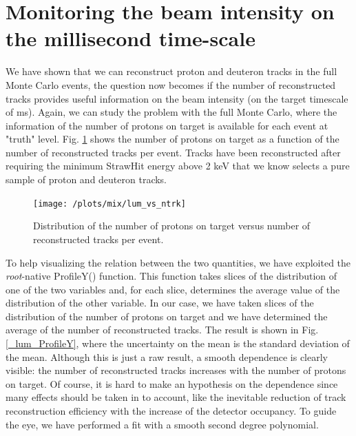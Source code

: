 \documentclass[12pt,a4paper,openright, oneside, titlepage]{book} %
\begin{document}
\section{Monitoring the beam intensity on the millisecond time-scale}
We have shown that we can reconstruct proton and deuteron tracks in the full Monte Carlo events, the question now becomes if the number of reconstructed tracks provides useful information on the beam intensity (on the target timescale of ms). 
Again, we can study the problem with the full Monte Carlo, where the information of the number of protons on target is available for each event at "truth" level.
Fig. \ref{_lum_vs_ntrk} shows the number of protons on target as a function of the number of reconstructed tracks per event. 
Tracks have been reconstructed after requiring the minimum StrawHit energy above 2 keV that we know selects a pure sample of proton and deuteron tracks.

\begin{figure}[!htb]
\centering
\texttt{[image: /plots/mix/lum\_vs\_ntrk]}
\caption[Protons on target and number of tracks]
{Distribution of the number of protons on target versus number of reconstructed tracks per event.}
\label{_lum_vs_ntrk}
\end{figure}

\noindent To help visualizing the relation between the two quantities, we have exploited the \textit{root}-native ProfileY() function. 
This function takes slices of the distribution of one of the two variables and, for each slice, determines the average value of the distribution of the other variable. 
In our case, we have taken slices of the distribution of the number of protons on target and we have determined the average of the number of reconstructed tracks. 
The result is shown in Fig. \ref{_lum_ProfileY}, where the uncertainty on the mean is the standard deviation of the mean.
Although this is just a raw result, a smooth dependence is clearly visible: the number of reconstructed tracks increases with the number of protons on target. 
Of course, it is hard to make an hypothesis on the dependence since many effects should be taken in to account, like the inevitable reduction of track reconstruction efficiency with the increase of the detector occupancy.
To guide the eye, we have performed a fit with a smooth second degree polynomial.\\
\end{document}
